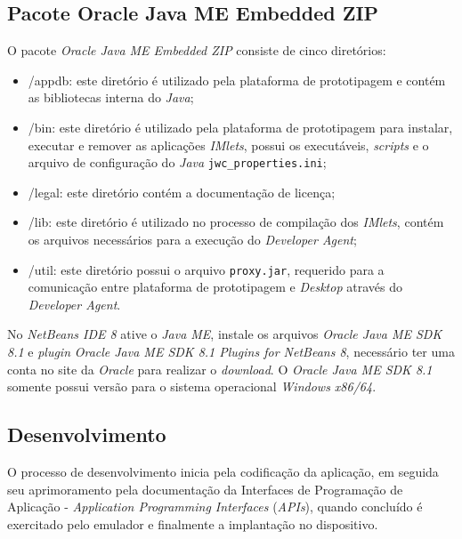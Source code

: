 \subsection{Pacote Oracle Java ME Embedded ZIP}

O pacote \textit{Oracle Java ME Embedded ZIP} consiste de cinco diretórios:

\begin{itemize}
    
    \item /appdb: este diretório é utilizado pela plataforma de prototipagem e 
    contém as bibliotecas interna do \textit{Java};
    
    \item /bin: este diretório é utilizado pela plataforma de prototipagem para 
    instalar, executar e remover as aplicações \textit{IMlets}, possui os 
    executáveis, \textit{scripts} e o arquivo de configuração do 
    \textit{Java} \verb|jwc_properties.ini|;
    
    \item /legal: este diretório contém a documentação de licença;
    
    \item /lib: este diretório é utilizado no processo de compilação dos 
    \textit{IMlets}, contém os arquivos necessários para a execução do 
    \textit{Developer Agent};
    
    \item /util: este diretório possui o arquivo \verb|proxy.jar|, requerido 
    para a comunicação entre plataforma de prototipagem e \textit{Desktop} 
    através do \textit{Developer Agent}.
    
\end{itemize}

No \textit{NetBeans IDE 8} ative o \textit{Java ME}, instale os arquivos 
\textit{Oracle Java ME SDK 8.1} e \textit{plugin} \textit{Oracle Java ME SDK 
8.1 Plugins for NetBeans 8}, necessário ter uma conta no site da 
\textit{Oracle} para realizar o \textit{download}. O \textit{Oracle Java ME SDK 
8.1} somente possui versão para o sistema operacional \textit{Windows x86/64}.

\subsection{Desenvolvimento}

O processo de desenvolvimento inicia pela codificação da aplicação, em seguida 
seu aprimoramento pela documentação da Interfaces de Programação de Aplicação - 
\textit{Application Programming Interfaces} (\textit{APIs}), quando concluído é 
exercitado pelo emulador e finalmente a implantação no dispositivo.

